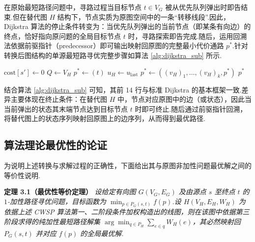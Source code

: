 在原始最短路径问题中，寻路过程当目标节点 $t \in V_G$ 被从优先队列弹出时即告结束.但在替代图 $H$ 结构下，节点实质为原图空间中的一条“转移线段”.因此，Dijkstra 算法的停止条件转变为：当优先队列弹出的当前节点（即某条有向边）的终点，恰好指向原问题的全局目标节点 $t$ 时，寻路探索即告完成.随后，运用回溯法依据前驱指针（predecessor）即可输出映射回原图的完整最小代价通路 $p^*$.针对转换后图结构的单源最短路寻优完整步骤如算法 \ref{alg:dijkstra_sub} 所示.

\begin{algorithm}[H]
\caption{基于替代图的 Dijkstra 寻路算法}\label{alg:dijkstra_sub}
$\text{cost}[s'] \leftarrow 0$ 
$Q \leftarrow V_H$\;
$p^* \leftarrow (t)$\;
$u_H \leftarrow u_{\text{last}}$\;
$p^* \leftarrow ((v_H)_1, \dots, (v_H)_k, p^*)$\;
\Return $p^*$\;
\end{algorithm}

结合算法 \ref{alg:dijkstra_sub} 可知，其前 14 行与标准 Dijkstra 的基本框架一致.差异主要体现在终止条件：在替代图 $H$ 中，节点对应原图中的边（或状态），因此当当前弹出的状态其末端节点达到目标节点 $t$ 时即可终止.随后通过前驱指针回溯，将替代图上的状态序列映射回原图上的边序列，从而得到最优路径.

\subsection{算法理论最优性的论证}
为说明上述转换与求解过程的正确性，下面给出其与原图非加性问题最优解之间的等价性说明.

\textbf{定理 3.1（最优性等价定理）} \textit{设给定有向图 $G(V_G,E_G)$ 及由源点 $s$ 至终点 $t$ 的 $1$-加性路径寻优问题，目标函数为 $\min_{p \in P_G(s,t)} f(p)$.设 $H(V_H,E_H,W_H)$ 为依据上述 CWSP 算法第一、二阶段条件加权构造出的线图，则在该图中依据第三阶段求得的纯加性最短路径解集 $\arg\min_{q \in P_H} \sum_{e \in q} W_H(e)$，其必然映射回 $P_G(s,t)$ 并对应 $f(p)$ 的全局最优解.}

